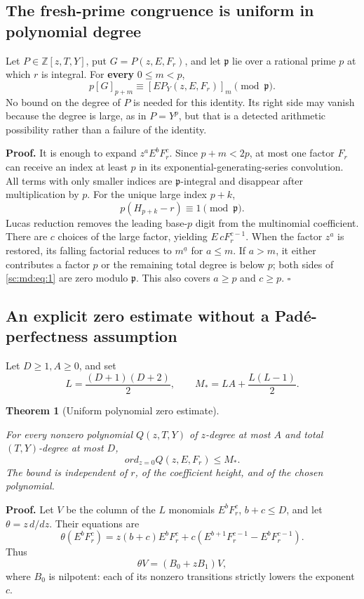 \documentclass[11pt,a4paper]{article}
\newtheorem{theorem}{Theorem}[section]
\theoremstyle{definition}
\theoremstyle{remark}
\theoremstyle{plain}
\numberwithin{equation}{section}
\def\operatorname#1{#1}\def\mathrm#1{#1}}
\begin{document}
\subsection{The fresh-prime congruence is uniform in polynomial
degree}\label{sc:md:the-fresh-prime-congruence-is-uniform-in-polynomial-degree}

Let \(P\in\mathbb Z[z,T,Y]\), put \(G=P(z,E,F_r)\), and let
\(\mathfrak p\) lie over a rational prime \(p\) at which \(r\) is
integral. For \textbf{every} \(0\le m<p\), \[
\boxed{p[G]_{p+m}\equiv [E P_Y(z,E,F_r)]_m\pmod{\mathfrak p}.}\tag{MD.1}\label{sc:md:eq:1}
\] No bound on the degree of \(P\) is needed for this identity. Its
right side may vanish because the degree is large, as in \(P=Y^p\), but
that is a detected arithmetic possibility rather than a failure of the
identity.

\textbf{Proof.} It is enough to expand \(z^aE^bF_r^c\). Since
\(p+m<2p\), at most one factor \(F_r\) can receive an index at least
\(p\) in its exponential-generating-series convolution. All terms with
only smaller indices are \(\mathfrak p\)-integral and disappear after
multiplication by \(p\). For the unique large index \(p+k\), \[
p(H_{p+k}-r)\equiv1\pmod{\mathfrak p}.
\] Lucas reduction removes the leading base-\(p\) digit from the
multinomial coefficient. There are \(c\) choices of the large factor,
yielding \(E\,cF_r^{c-1}\). When the factor \(z^a\) is restored, its
falling factorial reduces to \(m^{\underline a}\) for \(a\le m\). If
\(a>m\), it either contributes a factor \(p\) or the remaining total
degree is below \(p\); both sides of \eqref{sc:md:eq:1} are zero modulo
\(\mathfrak p\). This also covers \(a\ge p\) and \(c\ge p\). \(\square\)

\subsection{An explicit zero estimate without a Padé-perfectness
assumption}\label{sc:md:an-explicit-zero-estimate-without-a-paduxe9-perfectness-assumption}

Let \(D\ge1,A\ge0\), and set \[
L=\frac{(D+1)(D+2)}2,\qquad
M_*=LA+\frac{L(L-1)}2.
\]

\begin{theorem}[Uniform polynomial zero estimate]\label{sc:md:uniform-zero}

For every nonzero polynomial \(Q(z,T,Y)\) of \(z\)-degree at most \(A\)
and total \((T,Y)\)-degree at most \(D\), \[
\boxed{\operatorname{ord}_{z=0}Q(z,E,F_r)\le M_*.}\tag{MD.2}\label{sc:md:eq:2}
\] The bound is independent of \(r\), of the coefficient height, and of
the chosen polynomial.

\end{theorem}
\textbf{Proof.} Let \(V\) be the column of the \(L\) monomials
\(E^bF_r^c\), \(b+c\le D\), and let \(\theta=z\,d/dz\). Their equations
are \[
\theta(E^bF_r^c)=z(b+c)E^bF_r^c
+c(E^{b+1}F_r^{c-1}-E^bF_r^{c-1}).
\] Thus \[
\theta V=(B_0+zB_1)V,
\] where \(B_0\) is nilpotent: each of its nonzero transitions strictly
lowers the exponent \(c\).
\end{document}
